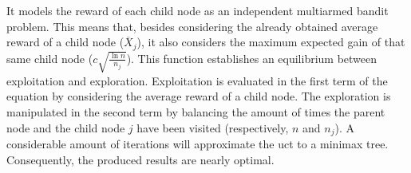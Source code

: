 It models the reward of each child node as an independent multiarmed bandit problem.
This means that, besides considering the already obtained average reward of a child node ($\overline{X}_j$), it also considers the maximum expected gain of that same child node ($c\sqrt{\frac{\ln n}{n_j}}$).
This function establishes an equilibrium between exploitation and exploration.
Exploitation is evaluated in the first term of the equation by considering the average reward of a child node.
The exploration is manipulated in the second term by balancing the amount of times the parent node and the child node $j$ have been visited (respectively, $n$ and $n_j$).
A considerable amount of iterations will approximate the \gls{uct} to a minimax tree.
Consequently, the produced results are nearly optimal.

 